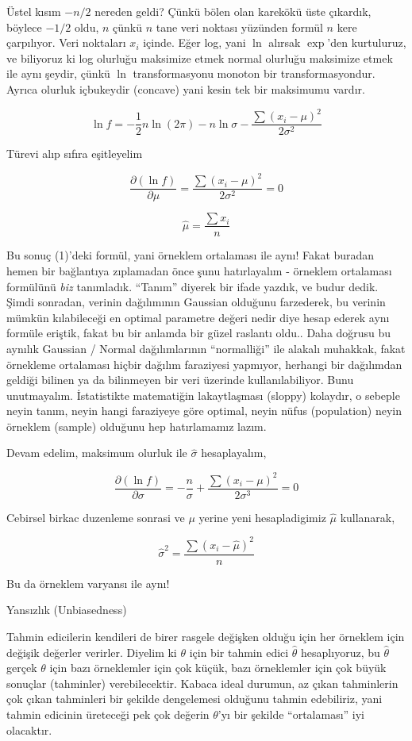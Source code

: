 \documentclass[12pt,fleqn]{article}\usepackage{../../common}
\begin{document}
Üstel kısım $-n/2$ nereden geldi? Çünkü bölen olan karekökü üste çıkardık,
böylece $-1/2$ oldu, $n$ çünkü $n$ tane veri noktası yüzünden formül $n$
kere çarpılıyor. Veri noktaları $x_i$ içinde. Eğer log, yani $\ln$ alırsak
$\exp$'den kurtuluruz, ve biliyoruz ki log olurluğu maksimize etmek normal
olurluğu maksimize etmek ile aynı şeydir, çünkü $\ln$ transformasyonu
monoton bir transformasyondur. Ayrıca olurluk içbukeydir (concave) yani
kesin tek bir maksimumu vardır. 

$$ \ln f = -\frac{1}{2} n \ln (2\pi) 
- n \ln \sigma - 
\frac{\sum (x_i-\mu)^2}{2\sigma^2}  
$$

Türevi alıp sıfıra eşitleyelim

$$ \frac{\partial (\ln f)}{\partial \mu} =
\frac{\sum (x_i-\mu)^2}{2\sigma^2}   = 0 
$$

$$ \hat{\mu} = \frac{\sum x_i }{n} $$

Bu sonuç (1)'deki formül, yani örneklem ortalaması ile aynı! Fakat buradan
hemen bir bağlantıya zıplamadan önce şunu hatırlayalım - örneklem
ortalaması formülünü {\em biz} tanımladık. ``Tanım'' diyerek bir ifade
yazdık, ve budur dedik. Şimdi sonradan, verinin dağılımının Gaussian
olduğunu farzederek, bu verinin mümkün kılabileceği en optimal parametre
değeri nedir diye hesap ederek aynı formüle eriştik, fakat bu bir anlamda
bir güzel raslantı oldu.. Daha doğrusu bu aynılık Gaussian / Normal
dağılımlarının ``normalliği'' ile alakalı muhakkak, fakat örnekleme
ortalaması hiçbir dağılım faraziyesi yapmıyor, herhangi bir dağılımdan
geldiği bilinen ya da bilinmeyen bir veri üzerinde kullanılabiliyor. Bunu
unutmayalım. İstatistikte matematiğin lakaytlaşması (sloppy) kolaydır, o
sebeple neyin tanım, neyin hangi faraziyeye göre optimal, neyin nüfus
(population) neyin örneklem (sample) olduğunu hep hatırlamamız lazım.

Devam edelim, maksimum olurluk ile $\hat{\sigma}$ hesaplayalım,

$$ \frac{\partial (\ln f)}{\partial \sigma} =
-\frac{n}{\sigma} + \frac{\sum (x_i-\mu)^2}{2\sigma^3}   = 0 
$$

Cebirsel birkac duzenleme sonrasi ve $\mu$ yerine yeni hesapladigimiz
$\hat{\mu}$ kullanarak,

$$ \hat{\sigma}^2 = \frac{\sum (x_i-\hat{\mu})^2}{n} $$

Bu da örneklem varyansı ile aynı! 

Yansızlık (Unbiasedness)

Tahmin edicilerin kendileri de birer rasgele değişken olduğu için her
örneklem için değişik değerler verirler. Diyelim ki $\theta$ için bir
tahmin edici $\hat{\theta}$ hesaplıyoruz, bu $\hat{\theta}$ gerçek $\theta$
için bazı örneklemler için çok küçük, bazı örneklemler için çok büyük
sonuçlar (tahminler) verebilecektir. Kabaca ideal durumun, az çıkan
tahminlerin çok çıkan tahminleri bir şekilde dengelemesi olduğunu tahmin
edebiliriz, yani tahmin edicinin üreteceği pek çok değerin $\theta$'yı bir
şekilde ``ortalaması'' iyi olacaktır.
\end{document}
